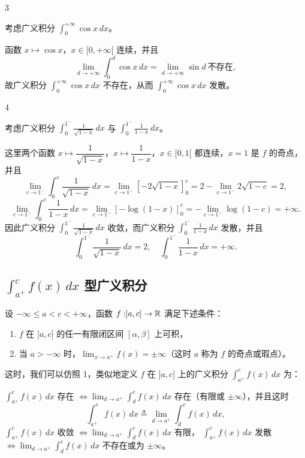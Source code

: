 \begin{sourceexample}{3}

考虑广义积分 $\displaystyle\int_0^{+\infty}\cos x\,dx$。

\end{sourceexample}

函数 $x\longmapsto\cos x$，$x\in[0,+\infty[$ 连续，并且
\[\lim_{d\to+\infty}\int_0^d\cos x\,dx=\lim_{d\to+\infty}\sin d\ \text{不存在},\]
故广义积分 $\displaystyle\int_0^{+\infty}\cos x\,dx$ 不存在，从而 $\displaystyle\int_0^{+\infty}\cos x\,dx$ 发散。

\begin{sourceexample}{4}

考虑广义积分 $\displaystyle\int_0^{1^-}\frac{1}{\sqrt{1-x}}\,dx$ 与 $\displaystyle\int_0^{1^-}\frac{1}{1-x}\,dx$。

\end{sourceexample}

这里两个函数 $x\longmapsto\dfrac{1}{\sqrt{1-x}}$，$x\longmapsto\dfrac{1}{1-x}$，$x\in[0,1[$ 都连续，$x=1$ 是 $f$ 的奇点，并且
\[\lim_{c\to1^-}\int_0^c\frac{1}{\sqrt{1-x}}\,dx=\lim_{c\to1^-}\left[-2\sqrt{1-x}\right]_0^c=2-\lim_{c\to1^-}2\sqrt{1-c}=2,\]
\[\lim_{c\to1^-}\int_0^c\frac{1}{1-x}\,dx=\lim_{c\to1^-}\left[-\log(1-x)\right]_0^c=-\lim_{c\to1^-}\log(1-c)=+\infty.\]
因此广义积分 $\displaystyle\int_0^{1^-}\frac{1}{\sqrt{1-x}}\,dx$ 收敛，而广义积分 $\displaystyle\int_0^{1^-}\frac{1}{1-x}\,dx$ 发散，并且
\[\int_0^{1^-}\frac{1}{\sqrt{1-x}}\,dx=2,\quad\int_0^{1^-}\frac{1}{1-x}\,dx=+\infty.\]

\subsection{\texorpdfstring{\(\int_{a^+}^cf(x)\,dx\) 型广义积分}{a+ 到 c 型广义积分}}
	\label{sec:9-1-2}

设 $-\infty\leqslant a<c<+\infty$，函数 $f:]a,c]\to\mathbb{R}$ 满足下述条件：

\begin{enumerate}[label=\arabic{enumi})]
\item $f$ 在 $]a,c]$ 的任一有限闭区间 $[\alpha,\beta]$ 上可积，
\item 当 $a>-\infty$ 时，$\displaystyle\lim_{x\to a^+}f(x)=\pm\infty$（这时 $a$ 称为 $f$ 的奇点或瑕点）。
\end{enumerate}

这时，我们可以仿照 1，类似地定义 $f$ 在 $]a,c]$ 上的广义积分 $\displaystyle\int_{a^+}^cf(x)\,dx$ 为：

$\displaystyle\int_{a^+}^cf(x)\,dx$ 存在 $\Longleftrightarrow\displaystyle\lim_{d\to a^+}\int_d^cf(x)\,dx$ 存在（有限或 $\pm\infty$），并且这时
\[\int_{a^+}^cf(x)\,dx\triangleq\lim_{d\to a^+}\int_d^cf(x)\,dx,\]
$\displaystyle\int_{a^+}^cf(x)\,dx$ 收敛 $\Longleftrightarrow\displaystyle\lim_{d\to a^+}\int_d^cf(x)\,dx$ 有限，
$\displaystyle\int_{a^+}^cf(x)\,dx$ 发散 $\Longleftrightarrow\displaystyle\lim_{d\to a^+}\int_d^cf(x)\,dx$ 不存在或为 $\pm\infty$。

